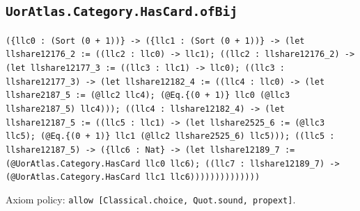 \documentclass[11pt]{article}
\begin{document}
\subsection*{\texttt{UorAtlas.Category.HasCard.ofBij}}
\noindent\texttt{(\{llc0 : (Sort (0 + 1))\} -> (\{llc1 : (Sort (0 + 1))\} -> (let llshare12176\_2 := ((llc2 : llc0) -> llc1); ((llc2 : llshare12176\_2) -> (let llshare12177\_3 := ((llc3 : llc1) -> llc0); ((llc3 : llshare12177\_3) -> (let llshare12182\_4 := ((llc4 : llc0) -> (let llshare2187\_5 := (@llc2 llc4); (@Eq.\{(0 + 1)\} llc0 (@llc3 llshare2187\_5) llc4))); ((llc4 : llshare12182\_4) -> (let llshare12187\_5 := ((llc5 : llc1) -> (let llshare2525\_6 := (@llc3 llc5); (@Eq.\{(0 + 1)\} llc1 (@llc2 llshare2525\_6) llc5))); ((llc5 : llshare12187\_5) -> (\{llc6 : Nat\} -> (let llshare12189\_7 := (@UorAtlas.Category.HasCard llc0 llc6); ((llc7 : llshare12189\_7) -> (@UorAtlas.Category.HasCard llc1 llc6))))))))))))))}\par
\noindent Axiom policy: \texttt{allow [Classical.choice, Quot.sound, propext]}.\par
\end{document}
